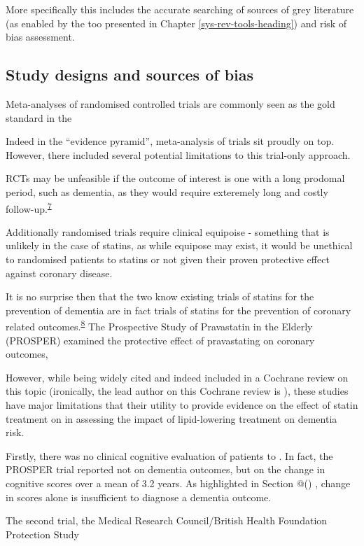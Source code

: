 \documentclass[a4paper, twoside]{templates/ociamthesis}
\begin{document}
More specifically this includes the accurate searching of sources of grey literature (as enabled by the too presented in Chapter \ref{sys-rev-tools-heading}) and risk of bias assessment.

\hypertarget{study-designs-and-sources-of-bias}{%
\subsection{Study designs and sources of bias}\label{study-designs-and-sources-of-bias}}

Meta-analyses of randomised controlled trials are commonly seen as the gold standard in the

Indeed in the ``evidence pyramid'', meta-analysis of trials sit proudly on top. However, there included several potential limitations to this trial-only approach.

RCTs may be unfeasible if the outcome of interest is one with a long prodomal period, such as dementia, as they would require exteremely long and costly follow-up.\textsuperscript{\protect\hyperlink{ref-ritchie2015}{7}}

Additionally randomised trials require clinical equipoise - something that is unlikely in the case of statins, as while equipose may exist, it would be unethical to randomised patients to statins or not given their proven protective effect against coronary disease.

It is no surprise then that the two know existing trials of statins for the prevention of dementia are in fact trials of statins for the prevention of coronary related outcomes.\textsuperscript{\protect\hyperlink{ref-mcguinness2016a}{8}} The Prospective Study of Pravastatin in the Elderly (PROSPER) examined the protective effect of pravastating on coronary outcomes,

However, while being widely cited and indeed included in a Cochrane review on this topic (ironically, the lead author on this Cochrane review is ), these studies have major limitations that their utility to provide evidence on the effect of statin treatment on in assessing the impact of lipid-lowering treatment on dementia risk.

Firstly, there was no clinical cognitive evaluation of patients to . In fact, the PROSPER trial reported not on dementia outcomes, but on the change in cognitive scores over a mean of 3.2 years. As highlighted in Section @() , change in scores alone is insufficient to diagnose a dementia outcome.

The second trial, the Medical Research Council/British Health Foundation Protection Study
\end{document}
